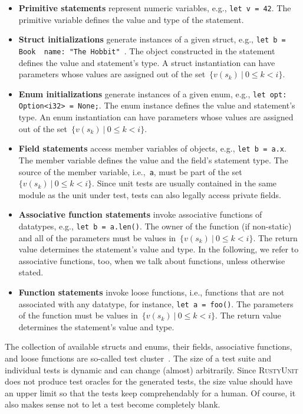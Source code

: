 \documentclass[paper=a4,%
  twoside,%
  BCOR4mm,%
  abstract=true,%
  toc=bibliography,%
  chapterprefix=true,%
  toc=bibliographynumbered,%
  open=right,%
  english,%
  pagesize=pdftex]{scrreprt}
\newcommand{\tech}{\textsc{RustyUnit}\xspace}
\begin{document}
\begin{itemize}
    \item \textbf{Primitive statements} represent numeric variables, e.g., \texttt{let v = 42}. The primitive variable defines the value and type of the statement.
    \item \textbf{Struct initializations} generate instances of a given struct, e.g., \texttt{let b = Book { name: "The Hobbit" }}. The object constructed in the statement defines the value and statement's type. A struct instantiation can have parameters whose values are assigned out of the set~$\{v(s_k)~|~0 \leq k < i\}$.
    \item \textbf{Enum initializations} generate instances of a given enum, e.g., \texttt{let opt: Option<i32> = None;}. The enum instance defines the value and statement's type. An enum instantiation can have parameters whose values are assigned out of the set~$\{v(s_k)~|~0 \leq k < i\}$.
    \item \textbf{Field statements} access member variables of objects, e.g., \texttt{let b = a.x}. The member variable defines the value and the field's statement type. The source of the member variable, i.e.,~\texttt{a}, must be part of the set~$\{v(s_k)~|~0 \leq k < i\}$. Since unit tests are usually contained in the same module as the unit under test, tests can also legally access private fields.
    \item \textbf{Associative function statements} invoke associative functions of datatypes, e.g., \texttt{let b = a.len()}. The owner of the function (if non-static) and all of the parameters must be values in~${\{v(s_k)~|~0 \leq k < i\}}$. The return value determines the statement's value and type. In the following, we refer to associative functions, too, when we talk about functions, unless otherwise stated.
    \item \textbf{Function statements} invoke loose functions, i.e., functions that are not associated with any datatype, for instance, \texttt{let a = foo()}. The parameters of the function must be values in~$\{v(s_k)~|~0 \leq k < i\}$. The return value determines the statement's value and type.
\end{itemize}

The collection of available structs and enums, their fields, associative functions, and loose functions are so-called test cluster~\cite{Fraser_2011a}. The size of a test suite and individual tests is dynamic and can change (almost) arbitrarily. Since \tech does not produce test oracles for the generated tests, the size value should have an upper limit so that the tests keep comprehendably for a human. Of course, it also makes sense not to let a test become completely blank.
\end{document}
